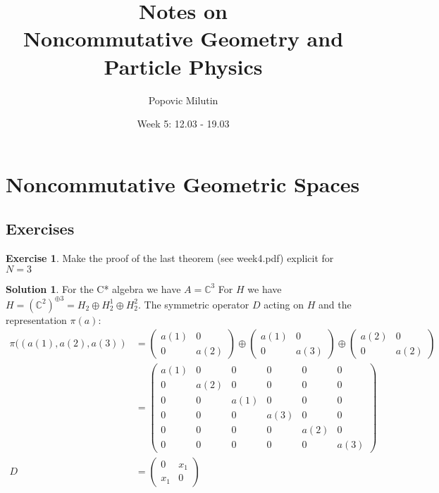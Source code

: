 \documentclass[a4paper]{article}
\title{Notes on \\ Noncommutative Geometry and Particle Physics}
\author{Popovic Milutin}
\date{Week 5: 12.03 - 19.03}
\theoremstyle{definition}
\theoremstyle{definition}
\theoremstyle{definition}
\theoremstyle{theorem}
\theoremstyle{theorem}
\theoremstyle{theorem}
\newtheorem{exercise}{Exercise}
\theoremstyle{definition}
\newtheorem{solution}{Solution}
\begin{document}
\maketitle
\tableofcontents

\section{Noncommutative Geometric Spaces }
\subsection{Exercises}
\begin{exercise}
    Make the proof of the last theorem (see week4.pdf) explicit for $N=3$
\end{exercise}
\begin{solution}
    For the C* algebra we have $A=\mathbb{C}^3$
    For $H$ we have $H = (\mathbb{C}^2)^{\oplus 3} = H_2 \oplus H_2^1 \oplus H_2^2$.
    The symmetric operator $D$ acting on $H$ and the representation $\pi (a)$:
    \begin{align}
        \pi((a(1), a(2), a(3)) &=
        \begin{pmatrix}
            a(1) & 0 \\ 0 & a(2)
        \end{pmatrix} \oplus
        \begin{pmatrix}
            a(1) & 0 \\ 0 & a(3)
        \end{pmatrix} \oplus
        \begin{pmatrix}
            a(2) & 0 \\ 0 & a(2)
        \end{pmatrix} \nonumber  \\
        & =
        \begin{pmatrix}
            a(1) & 0 & 0 & 0 & 0 & 0 \\
            0    & a(2) & 0 & 0 & 0 & 0 \\
            0    & 0 & a(1) & 0 & 0 & 0 \\
            0    & 0 & 0 & a(3) & 0 & 0 \\
            0    & 0 & 0 & 0 & a(2) & 0 \\
            0    & 0 & 0 & 0 & 0 & a(3)
        \end{pmatrix} \\
        D &=
        \begin{pmatrix}
            0 & x_1 \\ x_1 & 0

\end{pmatrix}
\end{align}
\end{solution}
\end{document}

